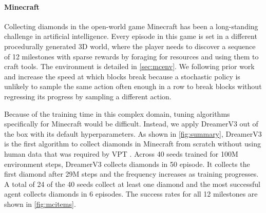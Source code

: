 \paragraph{Minecraft}

Collecting diamonds in the open-world game Minecraft has been a long-standing challenge in artificial intelligence.
Every episode in this game is set in a different procedurally generated 3D world, where the player needs to discover a sequence of 12 milestones with sparse rewards by foraging for resources and using them to craft tools.
The environment is detailed in \cref{sec:mcenv}.
We following prior work \citep{kanitscheider2021minecraftcurriculum} and increase the speed at which blocks break because a stochastic policy is unlikely to sample the same action often enough in a row to break blocks without regressing its progress by sampling a different action.

Because of the training time in this complex domain, tuning algorithms specifically for Minecraft would be difficult.
Instead, we apply DreamerV3 out of the box with its default hyperparameters.
As shown in \cref{fig:summary}, DreamerV3 is the first algorithm to collect diamonds in Minecraft from scratch without using human data that was required by VPT \citep{baker2022vpt}.
Across 40 seeds trained for 100M environment steps, DreamerV3 collects diamonds in 50 episode.
It collects the first diamond after 29M steps and the frequency increases as training progresses.
A total of 24 of the 40 seeds collect at least one diamond and the most successful agent collects diamonds in 6 episodes.
The success rates for all 12 milestones are shown in \cref{fig:mcitems}.
